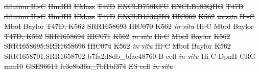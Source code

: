 \documentclass[a4,center,fleqn]{NAR}
\providecommand{\DIFdel}[1]{{\protect\color{red}\sout{#1}}}                      %
\providecommand{\DIFdelFL}[1]{\DIFdel{#1}} %
\begin{document}
\DIFdelFL{dilution Hi-C }%
\DIFdelFL{HindIII   }%
\DIFdelFL{UMass }%
\DIFdelFL{T47D }%
\DIFdelFL{ENCLB758KFU }%
\DIFdelFL{ENCLB183QHG }%
\DIFdelFL{T47D }%
\DIFdelFL{dilution Hi-C }%
\DIFdelFL{HindIII   }%
\DIFdelFL{UMass }%
\DIFdelFL{T47D }%
\DIFdelFL{ENCLB183QHG }%
\DIFdelFL{HIC069  }%
\DIFdelFL{K562 }%
\textit{\DIFdelFL{in situ}} %
\DIFdelFL{Hi-C }%
\DIFdelFL{MboI }%
\DIFdelFL{Baylor }%
\DIFdelFL{T47D, K562 }%
\DIFdelFL{SRR1658693 }%
\DIFdelFL{HIC070  }%
\DIFdelFL{K562 }%
\textit{\DIFdelFL{in situ}} %
\DIFdelFL{Hi-C }%
\DIFdelFL{MboI }%
\DIFdelFL{Baylor }%
\DIFdelFL{T47D, K562 }%
\DIFdelFL{SRR1658694 }%
\DIFdelFL{HIC071  }%
\DIFdelFL{K562 }%
\textit{\DIFdelFL{in situ}} %
\DIFdelFL{Hi-C }%
\DIFdelFL{MboI }%
\DIFdelFL{Baylor }%
\DIFdelFL{K562 }%
\DIFdelFL{SRR1658695,SRR1658696 }%
\DIFdelFL{HIC074  }%
\DIFdelFL{K562 }%
\textit{\DIFdelFL{in situ}} %
\DIFdelFL{Hi-C }%
\DIFdelFL{MboI }%
\DIFdelFL{Baylor }%
\DIFdelFL{K562 }%
\DIFdelFL{SRR1658701,SRR1658702 }%
\DIFdelFL{b7fa2d8db\_bfac48760 }%
\DIFdelFL{B cell  }%
\textit{\DIFdelFL{in situ}} %
\DIFdelFL{Hi-C }%
\DIFdelFL{DpnII }%
\DIFdelFL{CRG }%
\DIFdelFL{mm10 }%
\DIFdelFL{GSE96611 }%
\DIFdelFL{fc3e8b36a\_7bf1bf374 }%
\DIFdelFL{ES cell }%
\textit{\DIFdelFL{in situ}} %
\end{document}
